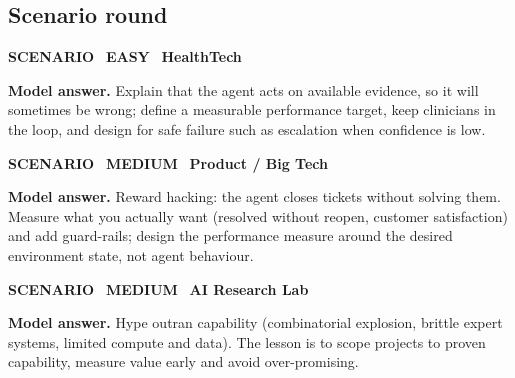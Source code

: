 \documentclass[11pt]{article}
\begin{document}
\subsection*{\color{leaf}Scenario round}
\begin{tcolorbox}[enhanced,breakable,colback=white,colframe=leaf,arc=2mm,boxrule=0.8pt,left=3mm,right=3mm,
 title={\textbf{QI.12}\quad A hospital asks for an 'omniscient' triage AI. How do you set expectations?},fonttitle=\color{white}\small,colbacktitle=leaf]
\colorbox{leaf!15}{\scriptsize\bfseries\color{leaf} SCENARIO}\
\colorbox{leaf!15}{\scriptsize\bfseries\color{leaf} EASY}\
\colorbox{navy!8}{\scriptsize\bfseries\color{navy} HealthTech}\par\smallskip
\textbf{\color{navy}Model answer.} Explain that the agent acts on available evidence, so it will sometimes be wrong; define a measurable performance target, keep clinicians in the loop, and design for safe failure such as escalation when confidence is low.
\end{tcolorbox}
\begin{tcolorbox}[enhanced,breakable,colback=white,colframe=leaf,arc=2mm,boxrule=0.8pt,left=3mm,right=3mm,
 title={\textbf{QI.13}\quad Your agent's performance measure is 'number of tickets closed'. What can go wrong?},fonttitle=\color{white}\small,colbacktitle=leaf]
\colorbox{leaf!15}{\scriptsize\bfseries\color{leaf} SCENARIO}\
\colorbox{gold!85!black!15}{\scriptsize\bfseries\color{gold!85!black} MEDIUM}\
\colorbox{navy!8}{\scriptsize\bfseries\color{navy} Product / Big Tech}\par\smallskip
\textbf{\color{navy}Model answer.} Reward hacking: the agent closes tickets without solving them. Measure what you actually want (resolved without reopen, customer satisfaction) and add guard-rails; design the performance measure around the desired environment state, not agent behaviour.
\end{tcolorbox}
\begin{tcolorbox}[enhanced,breakable,colback=white,colframe=leaf,arc=2mm,boxrule=0.8pt,left=3mm,right=3mm,
 title={\textbf{QI.14}\quad How would you explain to a manager why AI had 'winters', and what that means for today's projects?},fonttitle=\color{white}\small,colbacktitle=leaf]
\colorbox{leaf!15}{\scriptsize\bfseries\color{leaf} SCENARIO}\
\colorbox{gold!85!black!15}{\scriptsize\bfseries\color{gold!85!black} MEDIUM}\
\colorbox{navy!8}{\scriptsize\bfseries\color{navy} AI Research Lab}\par\smallskip
\textbf{\color{navy}Model answer.} Hype outran capability (combinatorial explosion, brittle expert systems, limited compute and data). The lesson is to scope projects to proven capability, measure value early and avoid over-promising.
\end{tcolorbox}
\end{document}
